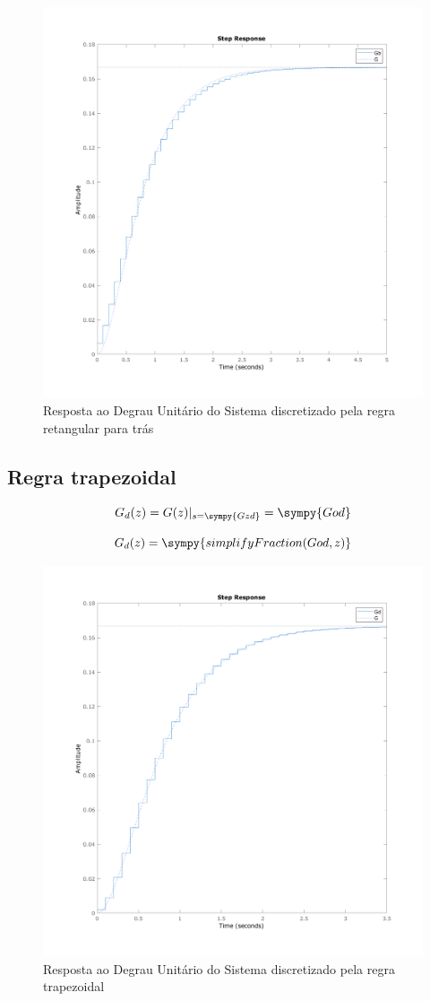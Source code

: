\documentclass[a4paper,11pt]{article}
\begin{document}
\begin{figure}[H]
    \centering
    \includegraphics[width=0.8\linewidth]{img/exsim2-plot-g-backward.png}
    \caption{Resposta ao Degrau Unitário do Sistema discretizado pela regra retangular para trás}
\end{figure}

\subsection{Regra trapezoidal}

$$
G_d(z) =  G(z)|_{s = \sympy{Gzd}} = \sympy{God}
$$

\begin{equation}
    G_d(z) = \sympy{simplifyFraction(God,z)}
\end{equation}

\begin{figure}[H]
    \centering
    \includegraphics[width=0.8\linewidth]{img/exsim2-plot-g-trap.png}
    \caption{Resposta ao Degrau Unitário do Sistema discretizado pela regra trapezoidal}
\end{figure}
\end{document}
